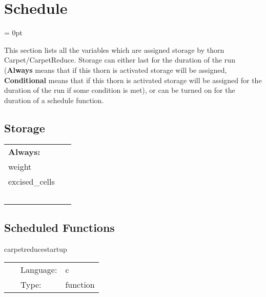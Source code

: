 
\section{Schedule} 


\parskip = 0pt


\noindent This section lists all the variables which are assigned storage by thorn Carpet/CarpetReduce.  Storage can either last for the duration of the run ({\bf Always} means that if this thorn is activated storage will be assigned, {\bf Conditional} means that if this thorn is activated storage will be assigned for the duration of the run if some condition is met), or can be turned on for the duration of a schedule function.


\subsection*{Storage}

\hspace{5mm}

 \begin{tabular*}{160mm}{ll} 

{\bf Always:}&  ~ \\ 
 weight & ~\\ 
 excised\_cells & ~\\ 
~ & ~\\ 
\end{tabular*} 


\subsection*{Scheduled Functions}
\vspace{5mm}


\hspace{5mm} carpetreducestartup 

\hspace{5mm}{\it startup routine } 


\hspace{5mm}

 \begin{tabular*}{160mm}{cll} 
~ & Language:  & c \\ 
~ & Type:  & function \\ 
\end{tabular*} 


\vspace{5mm}


